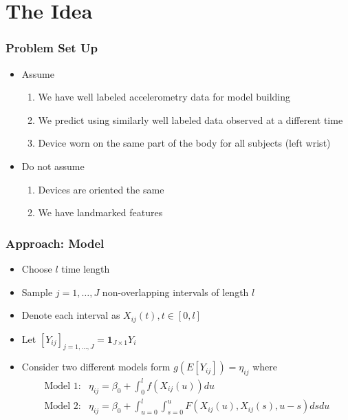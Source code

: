 \documentclass[10pt]{beamer}\usepackage[]{graphicx}\usepackage[]{color}
\begin{document}
\section{The Idea}
\begin{frame}
\frametitle{Problem Set Up}
\begin{itemize}
\item Assume
    \begin{enumerate}
    \item We have well labeled accelerometry data for model building
    \item We predict using similarly well labeled data observed at a different time
    \item Device worn on the same part of the body for all subjects (left wrist)
    \end{enumerate}
\item Do not assume
    \begin{enumerate}
    \item Devices are oriented the same
    \item We have landmarked features
    \end{enumerate}
\end{itemize}
\end{frame}

\begin{frame}
\frametitle{Approach: Model}
\begin{itemize}
\item Choose $l$ time length 
\item Sample $j = 1,\ldots, J$ non-overlapping intervals of length $l$
\item Denote each interval as $X_{ij}(t), t \in [0,l]$
\item Let $[Y_{ij}]_{j=1,\ldots,J} = \mathbf{1}_{J \times 1}Y_i$
\item Consider two different models form $g(E[Y_{ij}]) = \eta_{ij}$ where
\begin{align*}
\text{Model 1:} & \eta_{ij} = \beta_0 + \int_0^l f(X_{ij}(u)) du \\
\text{Model 2:} & \eta_{ij} = \beta_0 + \int_{u=0}^l \int_{s=0}^u F(X_{ij}(u), X_{ij}(s), u-s)ds du 
\end{align*}
\end{itemize}
\end{frame}
\end{document}
